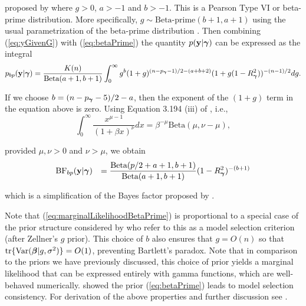 {\noindent proposed by \cite{Maruyama2011} where $g>0$, $a>-1$ and $b>-1$.  This
is a Pearson Type VI or beta-prime distribution. More specifically, $g\sim
\mbox{Beta-prime}(b+1,a+1)$ using the usual parametrization of the beta-prime
distribution \citep{Johnson1995}.  Then combining (\ref{eq:yGivenG}) with
(\ref{eq:betaPrime}) the quantity $p({\bf y}|{\boldsymbol \gamma})$ can be expressed as the
integral
$$
\displaystyle p_{bp}({\bf y}|{\boldsymbol \gamma}) 
=
\frac{K(n)}{\mbox{Beta}(a+1,b+1)}
\int_0^\infty             
g^{b}(1 + g)^{(n - p_{\boldsymbol \gamma} - 1)/2 - (a + b + 2)}  (1 + g (1-R_{\boldsymbol \gamma}^2) )^{-(n-1)/2}  
dg.
$$

\noindent If we choose 
$b = (n - p_{\boldsymbol \gamma} - 5)/2 - a$, then the exponent of the $(1 + g)$ term in the
equation above is zero.  Using Equation 3.194 (iii) of \cite{Gradshteyn2007},
i.e.,
$$
\int_0^\infty \frac{ x^{\mu - 1} }{(1 + \beta x)^\nu} dx = \beta^{-\mu} \mbox{Beta}(\mu,\nu - \mu),
$$

\noindent provided $\mu,\nu>0$ and $\nu>\mu$, we obtain
\begin{equation}\label{eq:marginalLikelihoodBetaPrime}
	\begin{array}{rl}
		\displaystyle \mbox{BF}_{bp}({\bf y}|{\boldsymbol \gamma}) 
		& \displaystyle 
		=   
		\frac{\mbox{Beta}(p/2 + a + 1,b + 1)}{\mbox{Beta}(a+1,b+1)} (1-R_{\boldsymbol \gamma}^2)^{-(b + 1)}
	\end{array}
\end{equation}

\noindent which is a simplification of the Bayes factor proposed by
\cite{Maruyama2011}.


Note that (\ref{eq:marginalLikelihoodBetaPrime}) is proportional to a special
case of the prior structure considered by \cite{Maruyama2011} who refer to this
as a model selection criterion (after Zellner's $g$ prior). This choice of $b$
also ensures that $g = O(n)$ so that $\mbox{tr}\{\mbox{Var}({\boldsymbol \beta} | g,
\sigma^2)\} = O(1)$, preventing Bartlett's paradox. 
Note that in comparison to the priors we have previously discussed, this choice
of prior yields a marginal likelihood that can be expressed entirely with gamma
functions, which are well-behaved numerically.  \cite{Maruyama2011} showed the
prior (\ref{eq:betaPrime}) leads to model selection consistency.  For
derivation of the above properties and further discussion see
\cite{Maruyama2011}.

}

